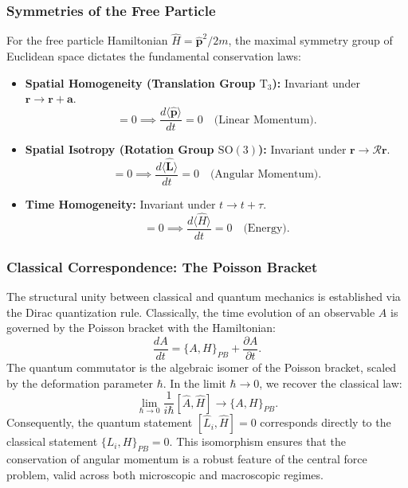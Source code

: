 \subsubsection{Symmetries of the Free Particle}
For the free particle Hamiltonian $\hat{H} = \hat{\mathbf{p}}^2/2m$, the maximal
symmetry group of Euclidean space dictates the fundamental conservation laws:
\begin{itemize}
	\item \textbf{Spatial Homogeneity (Translation Group $\mathrm{T}_3$):}
		Invariant under $\mathbf{r} \to \mathbf{r} + \mathbf{a}$.
		\begin{equation}
			[\hat{H}, \hat{\mathbf{p}}] = 0 \implies \frac{d\langle
			\hat{\mathbf{p}} \rangle}{dt} = 0 \quad \text{(Linear Momentum)}.
		\end{equation}
	\item \textbf{Spatial Isotropy (Rotation Group $\mathrm{SO}(3)$):}
		Invariant under $\mathbf{r} \to \mathcal{R}\mathbf{r}$.
		\begin{equation}
			[\hat{H}, \hat{\mathbf{L}}] = 0 \implies \frac{d\langle
			\hat{\mathbf{L}} \rangle}{dt} = 0 \quad \text{(Angular Momentum)}.
		\end{equation}
	\item \textbf{Time Homogeneity:}
		Invariant under $t \to t + \tau$.
		\begin{equation}
			[\hat{H}, \hat{H}] = 0 \implies \frac{d\langle \hat{H} \rangle}{dt} = 0
			\quad \text{(Energy)}.
		\end{equation}
\end{itemize}

\subsubsection{Classical Correspondence: The Poisson Bracket}
The structural unity between classical and quantum mechanics is established via
the Dirac quantization rule. Classically, the time evolution of an observable
$A$ is governed by the Poisson bracket with the Hamiltonian:
\begin{equation}
	\frac{dA}{dt} = \{A, H\}_{PB} + \frac{\partial A}{\partial t}.
\end{equation}
The quantum commutator is the algebraic isomer of the Poisson bracket, scaled by
the deformation parameter $\hbar$. In the limit $\hbar \to 0$, we recover the
classical law:
\begin{equation}
	\lim_{\hbar \to 0} \frac{1}{i\hbar} [\hat{A}, \hat{H}] \longrightarrow \{A,
	H\}_{PB}.
\end{equation}
Consequently, the quantum statement $[\hat{L}_i, \hat{H}] = 0$ corresponds
directly to the classical statement $\{L_i, H\}_{PB} = 0$. This isomorphism
ensures that the conservation of angular momentum is a robust feature of the
central force problem, valid across both microscopic and macroscopic regimes.

